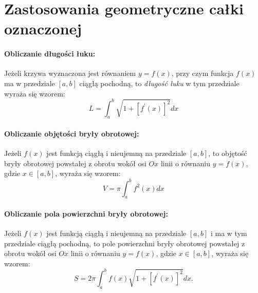 \documentclass[a4paper,12pt]{book}
\begin{document}
     

\section*{Zastosowania geometryczne całki oznaczonej} 


\paragraph{Obliczanie długości łuku:}
Jeżeli krzywa wyznaczona jest równaniem $y=f(x)$, przy czym \mbox{funkcja}
$f(x)$ ma w przedziale $[a,b]$ ciągłą pochodną, to {\em długość łuku} w tym
przedziale wyraża się wzorem: $$L = \int_a^b \sqrt{1 + [f^{'}(x)]^2}dx$$


\paragraph{Obliczanie objętości bryły obrotowej:}
Jeżeli $f(x)$ jest funkcją ciągłą i nieujemną na przedziale $[a,b]$, to
objętość bryły obrotowej powstałej z obrotu wokół osi $Ox$ linii o równaniu
$y =f(x)$, gdzie $x \in [a,b]$, wyraża się wzorem:
$$V = \pi \int_a^b f^2(x)dx$$


\paragraph{Obliczanie pola powierzchni bryły obrotowej:}
Jeżeli $f(x)$ jest funkcją ciągłą i nieujemną na przedziale $[a,b]$ i ma w
tym przedziale ciągłą pochodną, to pole powierzchni bryły obrotowej powstałej z
obrotu wokół osi $Ox$ linii o równaniu  $y = f(x)$, gdzie $x \in [a,b]$, wyraża się
wzorem:
$$S= 2\pi \int_a^b f(x) \sqrt{1 + [f^{'}(x)]^2}dx.$$
\end{document}
